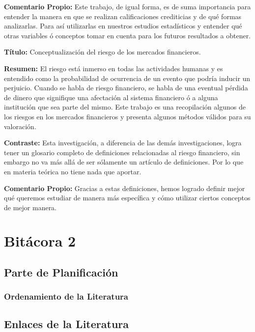 \documentclass[
  letterpaper,
  DIV=11,
  numbers=noendperiod]{scrreprt}
\begin{document}
\textbf{Comentario Propio:} Este trabajo, de igual forma, es de suma
importancia para entender la manera en que se realizan calificaciones
crediticias y de qué formas analizarlas. Para así utilizarlas en
nuestros estudios estadísticos y entender qué otras variables ó
conceptos tomar en cuenta para los futuros resultados a obtener.

\textbf{Título:} Conceptualización del riesgo de los mercados
financieros.

\textbf{Resumen:} El riesgo está inmerso en todas las actividades
humanas y es entendido como la probabilidad de ocurrencia de un evento
que podría inducir un perjuicio. Cuando se habla de riesgo financiero,
se habla de una eventual pérdida de dinero que signifique una afectación
al sistema financiero ó a alguna institución que sea parte del mismo.
Este trabajo es una recopilación algunos de los riesgos en los mercados
financieros y presenta algunos métodos válidos para su valoración.

\textbf{Contraste:} Esta investigación, a diferencia de las demás
investigaciones, logra tener un glosario completo de definiciones
relacionadas al riesgo financiero, sin embargo no va más allá de ser
sólamente un artículo de definiciones. Por lo que en materia teórica no
tiene nada que aportar.

\textbf{Comentario Propio:} Gracias a estas definiciones, hemos logrado
definir mejor qué queremos estudiar de manera más específica y cómo
utilizar ciertos conceptos de mejor manera.


\chapter{Bitácora 2}\label{bituxe1cora-2-1}

\section{Parte de Planificación}\label{parte-de-planificaciuxf3n-2}

\subsection{Ordenamiento de la
Literatura}\label{ordenamiento-de-la-literatura-1}

\section{Enlaces de la Literatura}\label{enlaces-de-la-literatura-1}
\end{document}
